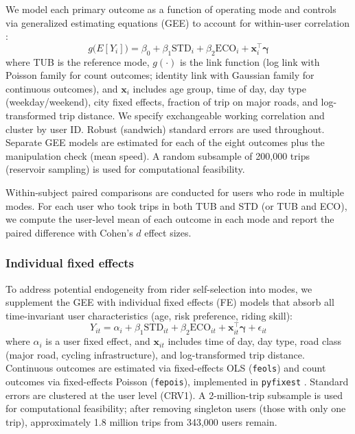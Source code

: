 We model each primary outcome as a function of operating mode and controls via generalized estimating equations (GEE) to account for within-user correlation \citep{zeger1986longitudinal}:
\begin{equation}
    g\big(E[Y_i]\big) = \beta_0 + \beta_1 \text{STD}_i + \beta_2 \text{ECO}_i + \boldsymbol{x}_i^{\top} \boldsymbol{\gamma}
    \label{eq:gee}
\end{equation}
where TUB is the reference mode, $g(\cdot)$ is the link function (log link with Poisson family for count outcomes; identity link with Gaussian family for continuous outcomes), and $\boldsymbol{x}_i$ includes age group, time of day, day type (weekday/weekend), city fixed effects, fraction of trip on major roads, and log-transformed trip distance. We specify exchangeable working correlation and cluster by user ID. Robust (sandwich) standard errors are used throughout. Separate GEE models are estimated for each of the eight outcomes plus the manipulation check (mean speed). A random subsample of 200,000 trips (reservoir sampling) is used for computational feasibility.

Within-subject paired comparisons are conducted for users who rode in multiple modes. For each user who took trips in both TUB and STD (or TUB and ECO), we compute the user-level mean of each outcome in each mode and report the paired difference with Cohen's $d$ effect sizes.

\subsubsection{Individual fixed effects}

To address potential endogeneity from rider self-selection into modes, we supplement the GEE with individual fixed effects (FE) models that absorb all time-invariant user characteristics (age, risk preference, riding skill):
\begin{equation}
    Y_{it} = \alpha_i + \beta_1 \text{STD}_{it} + \beta_2 \text{ECO}_{it} + \boldsymbol{x}_{it}^{\top} \boldsymbol{\gamma} + \epsilon_{it}
    \label{eq:fe}
\end{equation}
where $\alpha_i$ is a user fixed effect, and $\boldsymbol{x}_{it}$ includes time of day, day type, road class (major road, cycling infrastructure), and log-transformed trip distance. Continuous outcomes are estimated via fixed-effects OLS (\texttt{feols}) and count outcomes via fixed-effects Poisson (\texttt{fepois}), implemented in \texttt{pyfixest} \citep{fischer2024pyfixest}. Standard errors are clustered at the user level (CRV1). A 2-million-trip subsample is used for computational feasibility; after removing singleton users (those with only one trip), approximately 1.8 million trips from 343{,}000 users remain.

